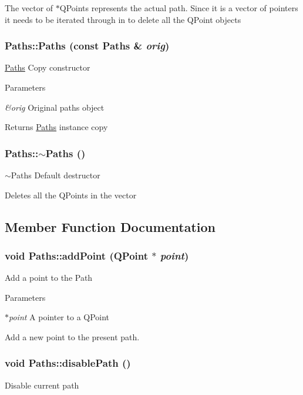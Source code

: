 The vector of $\ast$QPoints represents the actual path. Since it is a vector of pointers it needs to be iterated through in to delete all the QPoint objects \hypertarget{classPaths_a242273749e17d4d01bdf6361cacfd681}{
\subsubsection[{Paths}]{\setlength{\rightskip}{0pt plus 5cm}Paths::Paths (const {\bf Paths} \& {\em orig})}}
\label{classPaths_a242273749e17d4d01bdf6361cacfd681}
\hyperlink{classPaths}{Paths} Copy constructor 
\begin{DoxyParams}{Parameters}
\item[{\em \&orig}]Original paths object \end{DoxyParams}
\begin{DoxyReturn}{Returns}
\hyperlink{classPaths}{Paths} instance copy 
\end{DoxyReturn}
\hypertarget{classPaths_acfa042f197a222bd6c7bc0b08d94d867}{
\subsubsection[{$\sim$Paths}]{\setlength{\rightskip}{0pt plus 5cm}Paths::$\sim$Paths ()}}
\label{classPaths_acfa042f197a222bd6c7bc0b08d94d867}
$\sim$Paths Default destructor

Deletes all the QPoints in the vector 

\subsection{Member Function Documentation}
\hypertarget{classPaths_a202e6285ef5bf350b32e3cf0c8ec0da0}{
\subsubsection[{addPoint}]{\setlength{\rightskip}{0pt plus 5cm}void Paths::addPoint (QPoint $\ast$ {\em point})}}
\label{classPaths_a202e6285ef5bf350b32e3cf0c8ec0da0}
Add a point to the Path 
\begin{DoxyParams}{Parameters}
\item[{\em $\ast$point}]A pointer to a QPoint\end{DoxyParams}
Add a new point to the present path. \hypertarget{classPaths_af5bde53198945338dad9eadf3fcc9d88}{
\subsubsection[{disablePath}]{\setlength{\rightskip}{0pt plus 5cm}void Paths::disablePath ()}}
\label{classPaths_af5bde53198945338dad9eadf3fcc9d88}
Disable current path

